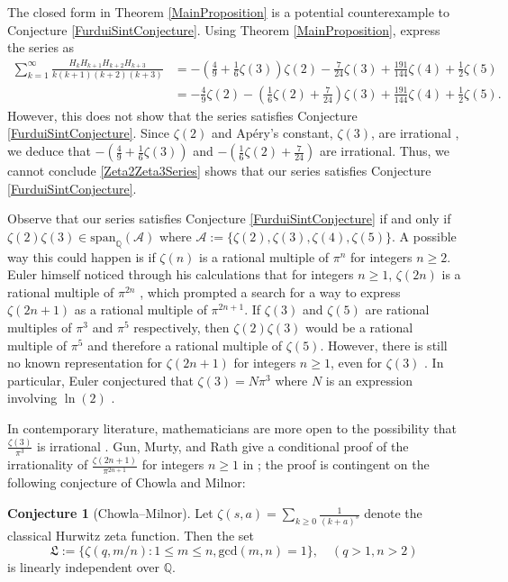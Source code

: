 \documentclass[10pt]{amsart}
\theoremstyle{definition}
\newtheorem{conjecture}{Conjecture}
\begin{document}
The closed form in Theorem \ref{MainProposition} is a potential counterexample to Conjecture \ref{FurduiSintConjecture}. Using Theorem \ref{MainProposition}, express the series as
\begin{equation} \label{Zeta2Zeta3Series}
    \begin{split}
        \sum_{k=1}^\infty \frac{H_k H_{k+1} H_{k+2} H_{k+3}}{k(k+1)(k+2)(k+3)} 
        &=  -\left(\frac{4}{9} + \frac{1}{6}\zeta(3)\right)\zeta (2) -\frac{7}{24} \zeta (3)+\frac{191}{144} \zeta (4)+\frac{1}{2}\zeta (5)\\
        &= -\frac{4}{9}\zeta(2) - \left(\frac{1}{6}\zeta(2) + \frac{7}{24}\right)\zeta(3) + \frac{191}{144} \zeta (4)+\frac{1}{2}\zeta (5).
    \end{split}
\end{equation}
However, this does not show that the series satisfies Conjecture \ref{FurduiSintConjecture}. Since $\zeta(2)$ and Apéry's constant, $\zeta(3)$, are irrational \cite{Apery}, we deduce that $-\left(\frac{4}{9} + \frac{1}{6}\zeta(3)\right)$ and $- \left(\frac{1}{6}\zeta(2) + \frac{7}{24}\right)$ are irrational. Thus, we cannot conclude \eqref{Zeta2Zeta3Series} shows that our series satisfies Conjecture \ref{FurduiSintConjecture}.

Observe that our series satisfies Conjecture \ref{FurduiSintConjecture} if and only if $\zeta(2)\zeta(3) \in \mathrm{span}_\mathbb{Q}(\mathcal{A})$ where $\mathcal{A} := \{\zeta(2), \zeta(3), \zeta(4), \zeta(5)\}$. A possible way this could happen is if $\zeta(n)$ is a rational multiple of $\pi^n$ for integers $n \geq 2$. Euler himself noticed through his calculations that for integers $n \geq 1$, $\zeta(2n)$ is a rational multiple of $\pi^{2n}$ \cite{Euler2}, which prompted a search for a way to express $\zeta(2n+1)$ as a rational multiple of $\pi^{2n+1}$. If $\zeta(3)$ and $\zeta(5)$ are rational multiples of $\pi^3$ and $\pi^5$ respectively, then $\zeta(2)\zeta(3)$ would be a rational multiple of $\pi^5$ and therefore a rational multiple of $\zeta(5)$. However, there is still no known representation for $\zeta(2n+1)$ for integers $n \geq 1$, even for $\zeta(3)$ \cite[pp. 266-267]{ApostolIntro}. In particular, Euler conjectured that $\zeta(3) = N\pi^3$ where $N$ is an expression involving $\ln(2)$ \cite[p. 12]{Nahin}.

In contemporary literature, mathematicians are more open to the possibility that $\frac{\zeta(3)}{\pi^3}$ is irrational \cite[p. 41]{Finch}. Gun, Murty, and Rath give a conditional proof of the irrationality of $\frac{\zeta(2n+1)}{\pi^{2n+1}}$ for integers $n\geq 1$ in \cite[p. 1341]{ChowlaMilnor}; the proof is contingent on the following conjecture of Chowla and Milnor:
\begin{conjecture}[Chowla--Milnor]\label{ChowlaMilnorConjecture}
    Let $\zeta(s,a)=\sum_{k\geq 0}\frac{1}{(k+a)^s}$ denote the classical Hurwitz zeta function. Then the set
    $$\mathfrak{L}:=\{\zeta(q,m/n):1\leq m\leq n,\text{gcd}(m,n)=1\},\quad (q>1,n>2)$$
    is linearly independent over $\mathbb{Q}.$
\end{conjecture}
\end{document}
